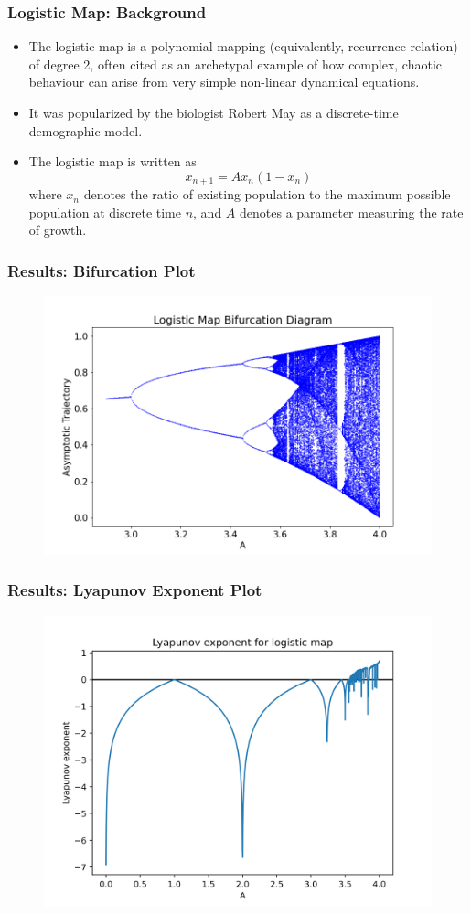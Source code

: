 \documentclass[
	11pt, %
	aspectratio=169, %
]{beamer}
\begin{document}
\begin{frame}
	\frametitle{Logistic Map: Background}
    
        \begin{itemize}
            \item The logistic map is a polynomial mapping (equivalently, recurrence relation) of degree 2, often cited as an archetypal example of how complex, chaotic behaviour can arise from very simple non-linear dynamical equations. \pause
            \item It was popularized by the biologist Robert May as a discrete-time demographic model. \pause
            \item The logistic map is written as
            \begin{equation}
                x_{n+1} = Ax_n(1-x_n)
            \end{equation}
            where $x_n$ denotes the ratio of existing population to the maximum possible population at discrete time $n$, and $A$ denotes a parameter measuring the rate of growth.
        \end{itemize}

\end{frame}


\begin{frame}
        \frametitle{Results: Bifurcation Plot}
    \begin{figure}
        \includegraphics[width=0.6\linewidth]{logistic_bifurcation_diagram.png}
    \end{figure}
\end{frame}


\begin{frame}
        \frametitle{Results: Lyapunov Exponent Plot}
    \begin{figure}
        \includegraphics[width=0.6\linewidth]{logistic_lyapunov_exp.png}
    \end{figure}
\end{frame}
\end{document}
